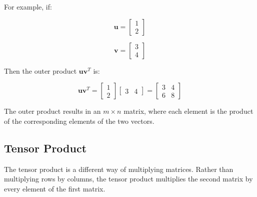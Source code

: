 \documentclass{article}
\begin{document}
For example, if:

\begin{equation}
    \mathbf{u} = \begin{bmatrix} 1 \\ 2 \end{bmatrix}
\end{equation}

\begin{equation}
    \mathbf{v} = \begin{bmatrix} 3 \\ 4 \end{bmatrix}
\end{equation}

Then the outer product \( \mathbf{u} \mathbf{v}^T \) is:

\begin{equation}
    \mathbf{u} \mathbf{v}^T = \begin{bmatrix}
        1 \\
        2
    \end{bmatrix}
    \begin{bmatrix}
        3 & 4
    \end{bmatrix}
    = \begin{bmatrix}
        3 & 4 \\
        6 & 8
    \end{bmatrix}
\end{equation}

The outer product results in an \( m \times n \) matrix, where each element is the product of the corresponding elements of the two vectors.

\subsection{Tensor Product}
The tensor product is a different way of multiplying matrices. Rather than multiplying rows by columns, the tensor product multiplies the second matrix by every element of the first matrix.
\end{document}
